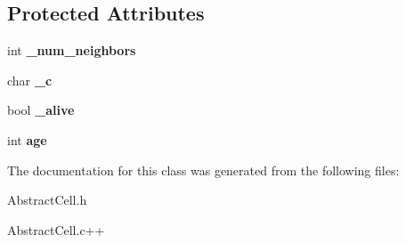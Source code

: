 \subsection*{\-Protected \-Attributes}
\begin{DoxyCompactItemize}
\item 
\hypertarget{classAbstractCell_a0b2c1bb4639340b9c803db787621eb66}{int {\bfseries \-\_\-num\-\_\-neighbors}}\label{classAbstractCell_a0b2c1bb4639340b9c803db787621eb66}

\item 
\hypertarget{classAbstractCell_a08b2d87c196da68e7a645125bfa5c3dd}{char {\bfseries \-\_\-c}}\label{classAbstractCell_a08b2d87c196da68e7a645125bfa5c3dd}

\item 
\hypertarget{classAbstractCell_acc1709ac6a09244b76c38dca45577111}{bool {\bfseries \-\_\-alive}}\label{classAbstractCell_acc1709ac6a09244b76c38dca45577111}

\item 
\hypertarget{classAbstractCell_a99e95bd6e878d85cb33a9fe90c4b7d25}{int {\bfseries age}}\label{classAbstractCell_a99e95bd6e878d85cb33a9fe90c4b7d25}

\end{DoxyCompactItemize}


\-The documentation for this class was generated from the following files\-:\begin{DoxyCompactItemize}
\item 
\-Abstract\-Cell.\-h\item 
\-Abstract\-Cell.\-c++\end{DoxyCompactItemize}
